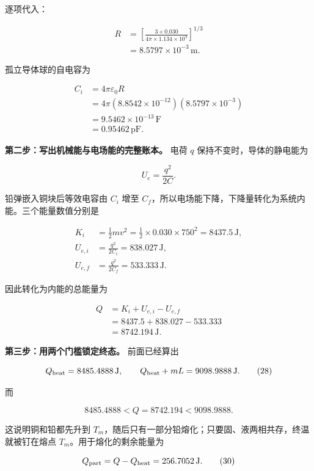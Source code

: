\documentclass[12pt,a4paper,UTF8]{ctexart}
\begin{document}
逐项代入：

\[
\begin{aligned}
R
&=\left[
\frac{3\times0.030}
{4\pi\times1.134\times10^4}
\right]^{1/3}\\
&=8.5797\times10^{-3}\,\mathrm m.
\end{aligned}
\tag{23}
\]

孤立导体球的自电容为

\[
\begin{aligned}
C_i
&=4\pi\varepsilon_0R\\
&=4\pi(8.8542\times10^{-12})(8.5797\times10^{-3})\\
&=9.5462\times10^{-13}\,\mathrm F\\
&=0.95462\,\mathrm{pF}.
\end{aligned}
\tag{24}
\]

\textbf{第二步：写出机械能与电场能的完整账本。} 电荷 \(q\)
保持不变时，导体的静电能为

\[
U_e=\frac{q^2}{2C}.
\tag{25}
\]

铅弹嵌入铜块后等效电容由 \(C_i\) 增至
\(C_f\)，所以电场能下降，下降量转化为系统内能。三个能量数值分别是

\[
\begin{aligned}
K_i&=\frac12mv^2
=\frac12\times0.030\times750^2
=8437.5\,\mathrm J,\\
U_{e,i}&=\frac{q^2}{2C_i}
=838.027\,\mathrm J,\\
U_{e,f}&=\frac{q^2}{2C_f}
=533.333\,\mathrm J.
\end{aligned}
\tag{26}
\]

因此转化为内能的总能量为

\[
\begin{aligned}
Q
&=K_i+U_{e,i}-U_{e,f}\\
&=8437.5+838.027-533.333\\
&=8742.194\,\mathrm J.
\end{aligned}
\tag{27}
\]

\textbf{第三步：用两个门槛锁定终态。} 前面已经算出

\[
Q_{\rm heat}=8485.4888\,\mathrm J,\qquad
Q_{\rm heat}+mL=9098.9888\,\mathrm J.
\tag{28}
\]

而

\[
8485.4888<Q=8742.194<9098.9888.
\tag{29}
\]

这说明铜和铅都先升到
\(T_m\)，随后只有一部分铅熔化；只要固、液两相共存，终温就被钉在熔点
\(T_m\)。用于熔化的剩余能量为

\[
Q_{\rm part}=Q-Q_{\rm heat}
=256.7052\,\mathrm J.
\tag{30}
\]
\end{document}

